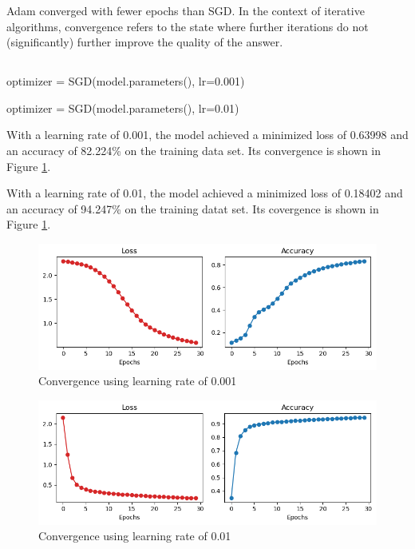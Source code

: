 \documentclass[11pt]{article}
\begin{document}
Adam converged with fewer epochs than SGD. In the context of iterative
algorithms, convergence refers to the state where further iterations do not
(significantly) further improve the quality of the answer.

\subsection{}  %

\begin{python}[caption={Original Code},label={14code1}]
optimizer = SGD(model.parameters(), lr=0.001)
\end{python}

\begin{python}[caption={ModifiedCode},label={14code2}]
optimizer = SGD(model.parameters(), lr=0.01)
\end{python}

With a learning rate of 0.001, the model achieved a minimized loss of 0.63998
and an accuracy of 82.224\% on the training data set. Its convergence is shown
in Figure \ref{14fig1}.

With a learning rate of 0.01, the model achieved a minimized loss of 0.18402
and an accuracy of 94.247\% on the training datat set. Its covergence is shown
in Figure \ref{14fig1}.

\begin{figure}[H]
    \centering
    \includegraphics[width=5.5in]{14fig1.png}
    \caption{Convergence using learning rate of 0.001}
    \label{14fig1}
\end{figure}

\begin{figure}[H]
    \centering
    \includegraphics[width=5.5in]{14fig2.png}
    \caption{Convergence using learning rate of 0.01}
    \label{14fig2}
\end{figure}
\end{document}
